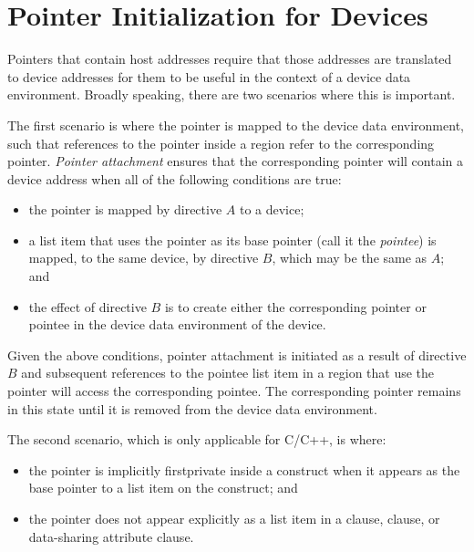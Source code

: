 \pagebreak
\section{Pointer Initialization for Devices}
\label{sec:pointer_mapping}

Pointers that contain host addresses require that those addresses are
translated to device addresses for them to be useful in the context of a device
data environment. Broadly speaking, there are two scenarios where this is
important.

The first scenario is where the pointer is mapped to the device data
environment, such that references to the pointer inside a  region
refer to the corresponding pointer. \emph{Pointer attachment} ensures that the
corresponding pointer will contain a device address when all of the following
conditions are true:

\begin{itemize}
 \item the pointer is mapped by directive $A$ to a device;
 \item a list item that uses the pointer as its base pointer (call it the
       \emph{pointee}) is mapped, to the same device, by directive $B$, which may
       be the same as $A$; and
 \item the effect of directive $B$ is to create either the corresponding
       pointer or pointee in the device data environment of the device.
\end{itemize}

Given the above conditions, pointer attachment is initiated as a result of
directive $B$ and subsequent references to the pointee list item in a
 region that use the pointer will access the corresponding
pointee. The corresponding pointer remains in this  state until
it is removed from the device data environment.

The second scenario, which is only applicable for C/C++, is where:

\begin{itemize}
 \item the pointer is implicitly firstprivate inside a  construct
       when it appears as the base pointer to a list item on the construct; and
 \item the pointer does not appear explicitly as a list item in a 
       clause,  clause, or data-sharing attribute clause.
\end{itemize}

